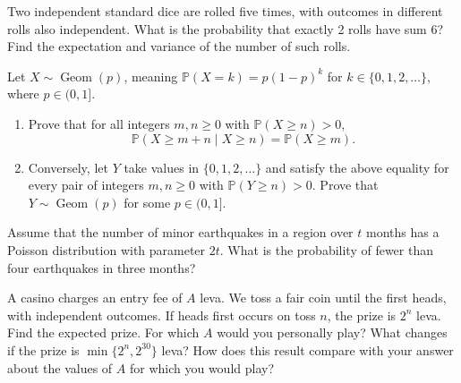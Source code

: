 \documentclass[11pt,a4paper]{article}
\newenvironment{enumeratea}{\begin{enumerate}[label=(\alph*),itemsep=0.28em,topsep=0.25em]}{\end{enumerate}}
\newcommand{\Pbb}{\mathbb P}
\newcommand{\Geom}{\operatorname{Geom}}
\newcounter{problem}[section]
\begin{document}
\begin{problembook}
Two independent standard dice are rolled five times, with outcomes in different
rolls also independent. What is the probability that exactly 2 rolls have sum 6?
Find the expectation and variance of the number of such rolls.
\end{problembook}
\begin{problempencil}
Let $X\sim\Geom(p)$, meaning $\Pbb(X=k)=p(1-p)^k$ for $k\in\{0,1,2,\dots\}$,
where $p\in(0,1]$.
\begin{enumeratea}
  \item Prove that for all integers $m,n\ge0$ with $\Pbb(X\ge n)>0$,
  \[ \Pbb(X\ge m+n\mid X\ge n)=\Pbb(X\ge m). \]
  \item Conversely, let $Y$ take values in $\{0,1,2,\dots\}$ and satisfy the above
  equality for every pair of integers $m,n\ge0$ with $\Pbb(Y\ge n)>0$.
  Prove that $Y\sim\Geom(p)$ for some $p\in(0,1]$.
\end{enumeratea}
\end{problempencil}
\begin{problembook}
Assume that the number of minor earthquakes in a region over $t$ months has a
Poisson distribution with parameter $2t$. What is the probability of fewer than
four earthquakes in three months?
\end{problembook}
\begin{probleminteresting}
A casino charges an entry fee of $A$ leva. We toss a fair coin until the first
heads, with independent outcomes. If heads first occurs on toss $n$, the prize
is $2^n$ leva. Find the expected prize. For which $A$ would you personally play?
What changes if the prize is $\min\{2^n,2^{30}\}$ leva? How does this result
compare with your answer about the values of $A$ for which you would play?
\end{probleminteresting}
\end{document}
